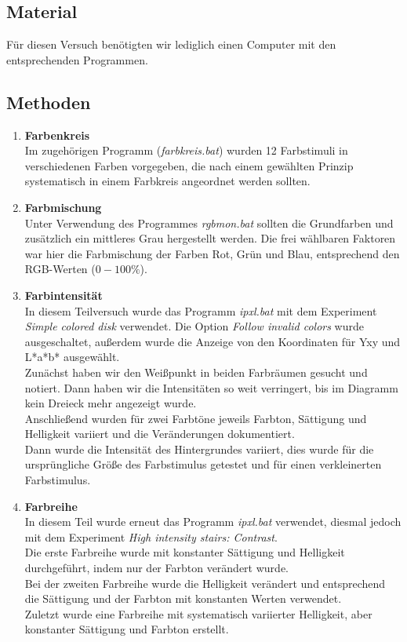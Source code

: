 \documentclass[11pt]{article}
\newcommand{\RM}[1]{\MakeUppercase{\romannumeral #1{}}}
\begin{document}
\subsection{Material}
Für diesen Versuch benötigten wir lediglich einen Computer mit den entsprechenden Programmen.
\subsection{Methoden}
\begin{enumerate}
\item \textbf{Farbenkreis} \\
Im zugehörigen Programm (\textit{farbkreis.bat}) wurden 12 Farbstimuli in verschiedenen Farben vorgegeben, die nach einem gewählten Prinzip systematisch in einem Farbkreis angeordnet werden sollten. 
\item \textbf{Farbmischung \RM{1}} \\
Unter Verwendung des Programmes \textit{rgbmon.bat} sollten die Grundfarben und zusätzlich ein mittleres Grau hergestellt werden. Die frei wählbaren Faktoren war hier die Farbmischung der Farben Rot, Grün und Blau, entsprechend den RGB-Werten ($0-100\%$). 
\item \textbf{Farbintensität} \\
In diesem Teilversuch wurde das Programm \textit{ipxl.bat} mit dem Experiment \textit{Simple colored disk} verwendet. Die Option \textit{Follow invalid colors} wurde ausgeschaltet, außerdem wurde die Anzeige von den Koordinaten für Yxy und L*a*b* ausgewählt. \\
Zunächst haben wir den Weißpunkt in beiden Farbräumen gesucht und notiert. Dann haben wir die Intensitäten so weit verringert, bis im Diagramm kein Dreieck mehr angezeigt wurde. \\
Anschließend wurden für zwei Farbtöne jeweils Farbton, Sättigung und Helligkeit variiert und die Veränderungen dokumentiert. \\
Dann wurde die Intensität des Hintergrundes variiert, dies wurde für die ursprüngliche Größe des Farbstimulus getestet und für einen verkleinerten Farbstimulus.
\item \textbf{Farbreihe} \\
In diesem Teil wurde erneut das Programm \textit{ipxl.bat} verwendet, diesmal jedoch mit dem Experiment \textit{High intensity stairs: Contrast}. \\
Die erste Farbreihe wurde mit konstanter Sättigung und Helligkeit durchgeführt, indem nur der Farbton verändert wurde. \\
Bei der zweiten Farbreihe wurde die Helligkeit verändert und entsprechend die Sättigung und der Farbton mit konstanten Werten verwendet. \\
Zuletzt wurde eine Farbreihe mit systematisch variierter Helligkeit, aber konstanter Sättigung und Farbton erstellt.


\end{enumerate}
\end{document}
